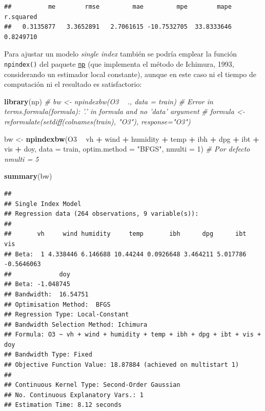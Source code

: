 \documentclass[
]{book}
\newenvironment{Shaded}{\begin{snugshade}}{\end{snugshade}}
\newcommand{\CommentTok}[1]{\textcolor[rgb]{0.56,0.35,0.01}{\textit{#1}}}
\newcommand{\DataTypeTok}[1]{\textcolor[rgb]{0.13,0.29,0.53}{#1}}
\newcommand{\DecValTok}[1]{\textcolor[rgb]{0.00,0.00,0.81}{#1}}
\newcommand{\KeywordTok}[1]{\textcolor[rgb]{0.13,0.29,0.53}{\textbf{#1}}}
\newcommand{\NormalTok}[1]{#1}
\newcommand{\OperatorTok}[1]{\textcolor[rgb]{0.81,0.36,0.00}{\textbf{#1}}}
\newcommand{\StringTok}[1]{\textcolor[rgb]{0.31,0.60,0.02}{#1}}
\theoremstyle{break}
\theoremstyle{definition}
\theoremstyle{definition}
\theoremstyle{definition}
\theoremstyle{remark}
\begin{document}
\begin{verbatim}
##          me        rmse         mae         mpe        mape   r.squared 
##   0.3135877   3.3652891   2.7061615 -10.7532705  33.8333646   0.8249710
\end{verbatim}

Para ajustar un modelo \emph{single index} también se podría emplear la función \texttt{npindex()} del paquete \href{https://github.com/JeffreyRacine/R-Package-np}{\texttt{np}} (que implementa el método de Ichimura, 1993, considerando un estimador local constante), aunque en este caso ni el tiempo de computación ni el resultado es satisfactorio:

\begin{Shaded}
\begin{Highlighting}[]
\KeywordTok{library}\NormalTok{(np)}
\CommentTok{# bw <- npindexbw(O3 ~ ., data = train)}
\CommentTok{# Error in terms.formula(formula): '.' in formula and no 'data' argument}
\CommentTok{# formula <- reformulate(setdiff(colnames(train), "O3"), response="O3")}

\NormalTok{bw <-}\StringTok{ }\KeywordTok{npindexbw}\NormalTok{(O3 }\OperatorTok{~}\StringTok{ }\NormalTok{vh }\OperatorTok{+}\StringTok{ }\NormalTok{wind }\OperatorTok{+}\StringTok{ }\NormalTok{humidity }\OperatorTok{+}\StringTok{ }\NormalTok{temp }\OperatorTok{+}\StringTok{ }\NormalTok{ibh }\OperatorTok{+}\StringTok{ }\NormalTok{dpg }\OperatorTok{+}\StringTok{ }\NormalTok{ibt }\OperatorTok{+}\StringTok{ }\NormalTok{vis }\OperatorTok{+}\StringTok{ }\NormalTok{doy,}
                \DataTypeTok{data =}\NormalTok{ train, }\DataTypeTok{optim.method =} \StringTok{"BFGS"}\NormalTok{, }\DataTypeTok{nmulti =} \DecValTok{1}\NormalTok{) }\CommentTok{# Por defecto nmulti = 5}
\end{Highlighting}
\end{Shaded}

\begin{Shaded}
\begin{Highlighting}[]
\KeywordTok{summary}\NormalTok{(bw)}
\end{Highlighting}
\end{Shaded}

\begin{verbatim}
## 
## Single Index Model
## Regression data (264 observations, 9 variable(s)):
## 
##       vh     wind humidity     temp       ibh      dpg      ibt        vis
## Beta:  1 4.338446 6.146688 10.44244 0.0926648 3.464211 5.017786 -0.5646063
##             doy
## Beta: -1.048745
## Bandwidth:  16.54751
## Optimisation Method:  BFGS
## Regression Type: Local-Constant
## Bandwidth Selection Method: Ichimura
## Formula: O3 ~ vh + wind + humidity + temp + ibh + dpg + ibt + vis + doy
## Bandwidth Type: Fixed
## Objective Function Value: 18.87884 (achieved on multistart 1)
## 
## Continuous Kernel Type: Second-Order Gaussian
## No. Continuous Explanatory Vars.: 1
## Estimation Time: 8.12 seconds
\end{verbatim}
\end{document}
